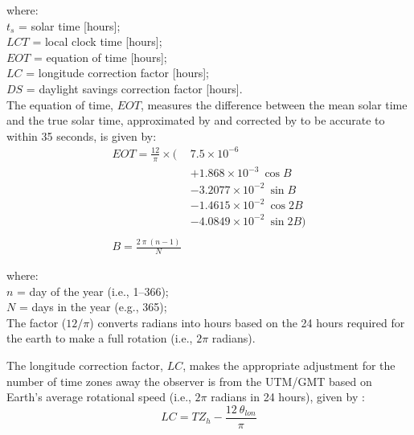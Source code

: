 \noindent where: \\
\indent $t_s$ = solar time [hours];\\
\indent $LCT$ = local clock time [hours];\\
\indent $EOT$ = equation of time [hours];\\
\indent $LC$ = longitude correction factor [hours]; \\
\indent $DS$  = daylight savings correction factor [hours]. \\

\noindent The equation of time, $EOT$, measures the difference between the mean solar time and the true solar time, approximated by \cite{spencer71} and corrected by \cite{oglesby98} to be accurate to within 35 seconds, is given by:
\begin{equation}
\label{eq:eotb}
	\begin{split}
    	EOT = \frac{12}{\pi} \times ( 
    	    & 7.5 \times 10^{-6} \\ 
        	& + 1.868 \times 10^{-3} \: \cos B \\ 
            & - 3.2077 \times 10^{-2} \: \sin B \\
            & - 1.4615 \times 10^{-2} \: \cos 2B \\
            & - 4.0849 \times 10^{-2} \: \sin 2B) \\
            & ~ \\
        B = \frac{2\: \pi\: \left(n - 1\right)}{N} & ~
	\end{split}
\end{equation}

\noindent where:\\
\indent $n$ = day of the year (i.e., 1--366);\\
\indent $N$ = days in the year (e.g., 365);\\

\noindent The factor ($12/\pi$) converts radians into hours based on the 24 hours required for the earth to make a full rotation (i.e., $2\pi$ radians). 

The longitude correction factor, $LC$, makes the appropriate adjustment for the number of time zones away the observer is from the UTM/GMT based on Earth's average rotational speed (i.e., $2\pi$ radians in 24 hours), given by \parencite{stine01}:
\begin{equation}
\label{eq:lc}
    LC = TZ_h - \frac{12\: \theta_{lon}}{\pi}
\end{equation}


